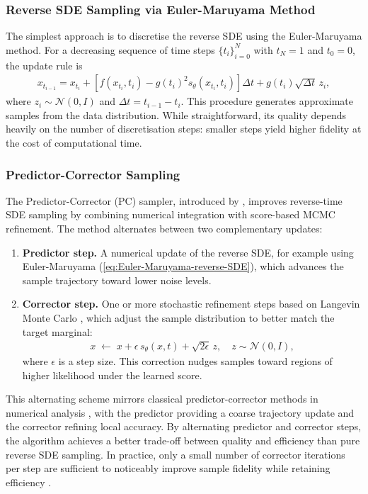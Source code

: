 \documentclass[a4paper,12pt]{article}
\begin{document}
\subsubsection{Reverse SDE Sampling via Euler-Maruyama Method}
The simplest approach is to discretise the reverse SDE using the Euler-Maruyama method. For a decreasing sequence of time steps \(\{t_i\}_{i=0}^N\) with \(t_N = 1\) and \(t_0 = 0\), the update rule is
\begin{align}\label{eq:Euler-Maruyama-reverse-SDE}
    x_{t_{i-1}} = x_{t_i} + \left[f(x_{t_i},t_i) - g(t_i)^2 s_\theta(x_{t_i},t_i)\right]\Delta t + g(t_i)\sqrt{\Delta t}\,z_i,
\end{align}
where \(z_i \sim \mathcal{N}(0,I)\) and \(\Delta t = t_{i-1} - t_i\). This procedure generates approximate samples from the data distribution. While straightforward, its quality depends heavily on the number of discretisation steps: smaller steps yield higher fidelity at the cost of computational time.

\subsubsection{Predictor-Corrector Sampling}\label{sec:PC-sampling}
The Predictor-Corrector (PC) sampler, introduced by \citet{song2021ScoreBasedGenerativeModeling}, improves reverse-time SDE sampling by combining numerical integration with score-based MCMC refinement. The method alternates between two complementary updates:
\begin{enumerate}
    \item \textbf{Predictor step.} A numerical update of the reverse SDE, for example using Euler-Maruyama (\cref{eq:Euler-Maruyama-reverse-SDE}), which advances the sample trajectory toward lower noise levels.
    \item \textbf{Corrector step.} One or more stochastic refinement steps based on Langevin Monte Carlo \citep{parisi1981CorrelationFunctionsComputer}, which adjust the sample distribution to better match the target marginal:
        \begin{align*}
            x \;\leftarrow\; x + \epsilon\, s_\theta(x,t) + \sqrt{2\epsilon}\,z, 
            \quad z \sim \mathcal{N}(0,I),
        \end{align*}
        where \(\epsilon\) is a step size. This correction nudges samples toward regions of higher likelihood under the learned score.
\end{enumerate}
This alternating scheme mirrors classical predictor-corrector methods in numerical analysis \citep{allgower2012numerical}, with the predictor providing a coarse trajectory update and the corrector refining local accuracy. By alternating predictor and corrector steps, the algorithm achieves a better trade-off between quality and efficiency than pure reverse SDE sampling. In practice, only a small number of corrector iterations per step are sufficient to noticeably improve sample fidelity while retaining efficiency \citep{song2021ScoreBasedGenerativeModeling}.
\end{document}
